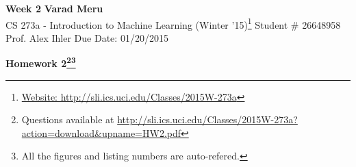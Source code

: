 \documentclass[a4paper, 11pt]{article}
\begin{document}
\begin{noindent}
\large\textbf{Week 2} \hfill \textbf{Varad Meru} \\
\normalsize CS 273a - Introduction to Machine Learning (Winter '15)\footnote{\href{http://sli.ics.uci.edu/Classes/2015W-273a}{Website: http://sli.ics.uci.edu/Classes/2015W-273a}} \hfill Student \# 26648958 \\
Prof. Alex Ihler \hfill Due Date: 01/20/2015
\end{noindent}
\noindent\makebox[\linewidth]{\rule{\textwidth}{0.4pt}}

\begin{center}
\textbf{\Large{Homework 2}\footnote{Questions available at \href{http://sli.ics.uci.edu/Classes/2015W-273a?action=download\&upname=HW2.pdf}{http://sli.ics.uci.edu/Classes/2015W-273a?action=download\&upname=HW2.pdf}}\footnote{All the figures and listing numbers are auto-refered.}}\\
\end{center}
\vspace{-25pt}

\end{document}
